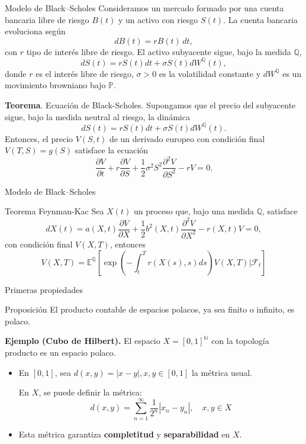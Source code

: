 \documentclass[8pt]{beamer}
\begin{document}
    \begin{frame}{Modelo de Black--Scholes}
    Consideramos un mercado formado por una cuenta bancaria libre de riesgo $B(t)$ y un activo con riesgo $S(t)$. La cuenta bancaria evoluciona según
    \[
        dB(t) = rB(t)\, dt,
        \]
    con $r$ tipo de interés libre de riesgo. 
    \pause
    El activo subyacente sigue, bajo la medida $\mathbb{Q}$,
    \[
        dS(t) = r S(t) dt + \sigma S(t) dW^\mathbb{Q} (t),
        \]
    donde $r$ es el interés libre de riesgo, $\sigma >0 $ es la volatilidad constante y $dW^\mathbb{Q}$ es un movimiento browniano bajo $\mathbb{P}$.
    \pause
    \begin{block}{\textbf{Teorema}. Ecuación de Black-Scholes.}
        Supongamos que el precio del subyacente sigue, bajo la medida neutral al riesgo, la dinámica
        \[
            dS(t) = r S(t) dt + \sigma S(t) dW^\mathbb{Q} (t).
            \]
        Entonces, el precio $V(S,t)$ de un derivado europeo con condición final $V(T,S) = g(S)$ satisface la ecuación
        \begin{equation}
            \frac{\partial V}{\partial t} + r \frac{\partial V}{\partial S} + \frac{1}{2}\sigma ^2 S^2 \frac{\partial ^2 V}{\partial S^2}-rV = 0. 
        \end{equation}
    \end{block}

\end{frame}

\begin{frame}{Modelo de Black--Scholes}
    \begin{block}{Teorema Feynman-Kac}
    Sea $X(t)$ un proceso que, bajo una medida $\mathbb Q$, satisface
    \[
        dX(t) = a(X,t)\frac{\partial V}{\partial X} + \frac{1}{2} b^2(X,t)\frac{\partial ^2 V}{\partial X^2} - r(X,t)V = 0, 
        \]
    con condición final $V(X,T)$, entonces
    \[
        V(X,T) = \mathbb{E}^\mathbb{Q}\left[ \exp \left( - \int_t^T r(X(s),s) ds\right)V(X,T) | \mathcal{F}_t \right]
        \]
    \end{block}
\end{frame}



\begin{frame}{Primeras propiedades}
 \begin{block}{Proposición}
     El producto contable de espacios polacos, ya sea finito o infinito, es polaco.
 \end{block}
 \pause
  \textbf{Ejemplo (Cubo de Hilbert).} El espacio $X = [0,1]^\mathbb N$ con la topología producto es un espacio polaco.
  \begin{itemize}
    \item En $[0,1]$, sea $d(x,y) = |x-y|, x,y \in [0,1]$ la métrica usual.
    \vspace{0.2cm}
    
    En $X$, se puede definir la métrica:
    \[ d(x, y) = \sum_{n=1}^\infty \frac{1}{2^n} |x_n -y_n|, \quad x,y \in X \]
    \item Esta métrica garantiza \textbf{completitud} y \textbf{separabilidad} en $X$.
  \end{itemize}
\end{frame}
\end{document}
